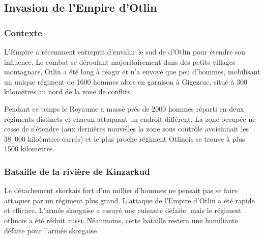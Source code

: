 \documentclass[french, a4paper, 12pt]{article}
\begin{document}
\subsection{Invasion de l'Empire d'Otlin}

\subsubsection{Contexte}
L'Empire a récemment entreprit d'envahir le sud de d'Otlin pour étendre son influence. Le combat se déroulant majoritairement dans des petits villages montagnars, Otlin a été long à réagir et n'a envoyé que peu d'hommes, mobilisant un unique régiment de 1600 hommes alors en garnison à Gigezruc, situé à 300 kilomètres au nord de la zone de conflits.

Pendant ce temps le Royaume a massé près de 2000 hommes réparti en deux régiments distincts et chacun attaquant un endroit différent. La zone occupée ne cesse de s'étendre (aux dernières nouvelles la zone sous contrôle avoisinnait les 38~000 kiloèmtres carrés) et le plus proche régiment Otlinois se trouve à plus 1500 kilomètres.

\subsubsection{Bataille de la rivière de Kinzarkud}
Le détachement skorkais fort d'un millier d'hommes ne pensait pas se faire attaquer par un régiment plus grand. L'attaque de l'Empire d'Otlin a été rapide et efficace. L'armée skorgaise a essuyé une cuisante défaite, mais le régiment otlinois a été réduit aussi. Néanmoins, cette bataille restera une humiliante défaite pour l'armée skorgaise.
\end{document}
